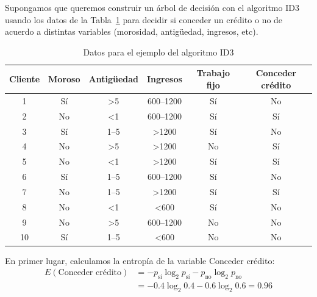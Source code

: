 \begin{ejemplo}
	Supongamos que queremos construir un árbol de decisión con el algoritmo ID3 usando los datos de la Tabla~\ref{tbl:ejemploarboldecision} para decidir si conceder un crédito o no de acuerdo a distintas variables (morosidad, antigüedad, ingresos, etc).\\
	
	\begin{table}[htbp!]
		\centering
		\caption{Datos para el ejemplo del algoritmo ID3}
		\label{tbl:ejemploarboldecision}
		\begin{tabular}{@{}cccccc@{}}
			\toprule
			Cliente & Moroso & Antigüedad    & Ingresos         & Trabajo fijo & Conceder crédito \\ \midrule
			1       & Sí     & \textgreater5 & 600--1200        & Sí           & No               \\
			2       & No     & \textless1    & 600--1200        & Sí           & Sí               \\
			3       & Sí     & 1--5          & \textgreater1200 & Sí           & No               \\
			4       & No     & \textgreater5 & \textgreater1200 & No           & Sí               \\
			5       & No     & \textless1    & \textgreater1200 & Sí           & Sí               \\
			6       & Sí     & 1--5          & 600--1200        & Sí           & No               \\
			7       & No     & 1--5          & \textgreater1200 & Sí           & Sí               \\
			8       & No     & \textless1    & \textless600     & Sí           & No               \\
			9       & No     & \textgreater5 & 600--1200        & No           & No               \\
			10      & Sí     & 1--5          & \textless600     & No           & No               \\ \bottomrule
		\end{tabular}
	\end{table}
	
	En primer lugar, calculamos la entropía de la variable Conceder crédito:\\
	
	\begin{align*}
	E(\text{Conceder crédito})& = -p_\text{sí}\log_2 p_\text{sí}- p_\text{no}\log_2 p_\text{no}\\
	                          & = -0.4\log_2 0.4 - 0.6 \log_2 0.6 = 0.96
	\end{align*}
	

\end{ejemplo}

